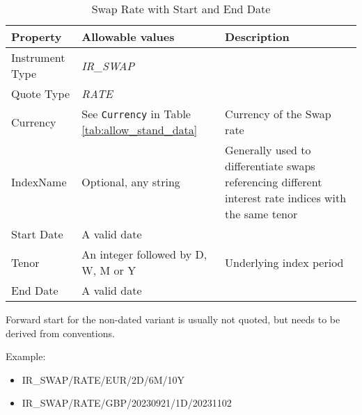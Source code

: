 \begin{table}[H]
\centering
  \begin{tabular}{|p{3cm}|p{3.5cm}|p{7cm}|}
    \hline
    {\bf Property} & {\bf Allowable values} & {\bf Description} \\ \hline
    Instrument Type & \emph{IR\_SWAP} & \\ \hline
    Quote Type & \emph{RATE} & \\ \hline
    Currency & See \lstinline!Currency! in Table \ref{tab:allow_stand_data} & Currency of the Swap rate\\ \hline
    IndexName & Optional, any string & Generally used to differentiate swaps referencing different interest rate indices with the same tenor\\ \hline
    Start Date & A valid date \\ \hline
    Tenor & An integer followed by D, W, M or Y & Underlying index period \\ \hline
    End Date & A valid date \\ \hline
  \end{tabular}
  \caption{Swap Rate with Start and End Date}
  \label{tab:swaprate_quote_dated}
\end{table}

Forward start for the non-dated variant is usually not quoted, but needs to be derived from conventions.

\medskip
Example:
\begin{itemize}
\item {IR\_SWAP/RATE/EUR/2D/6M/10Y}
\item {IR\_SWAP/RATE/GBP/20230921/1D/20231102}
\end{itemize}



